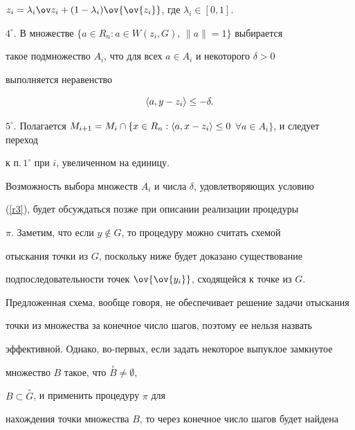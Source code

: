$z_i=\lambda_i \ov z_i + (1-\lambda_i)\ov{\ov{z_i}}$, где $\lambda_i \in


[0,1]$.





$4^\circ$. В множестве $\{ a\in R_n: a\in W(z_i,G)$, $\|a\|=1\}$ выбирается


такое подмножество $A_i$, что для всех $a\in A_i$ и некоторого $\delta >0$


выполняется неравенство




\begin{equation} \label{r3}


\la a, y-z_i \ra \le -\delta.


\end{equation}


%





$5^\circ$. Полагается $M_{i+1}=M_i\cap \{x\in R_n:


\la a, x-z_i \ra \le 0$ $\forall a\in A_i\}$, и следует переход


к п.\,$1^\circ$ при $i$, увеличенном на единицу.


\medskip





Возможность выбора множеств $A_i$ и числа $\delta$, удовлетворяющих условию


(\ref{r3}), будет обсуждаться позже при описании реализации процедуры


$\pi$. Заметим, что если $y\not \in G$, то процедуру можно считать схемой


отыскания точки из $G$, поскольку ниже будет доказано существование


подпоследовательности точек $\ov{\ov{y_i}}$, сходящейся к точке из $G$.


Предложенная схема, вообще говоря, не обеспечивает решение задачи отыскания


точки из множества за конечное число шагов, поэтому ее нельзя назвать


эффективной. Однако, во-первых, если задать некоторое выпуклое замкнутое


множество $B$ такое, что  $\overset{\circ}{B}{} \ne \emptyset$,


$B\subset \overset{\circ}{G}{}$, и применить процедуру $\pi$ для


нахождения точки множества $B$, то через конечное число шагов будет найдена


